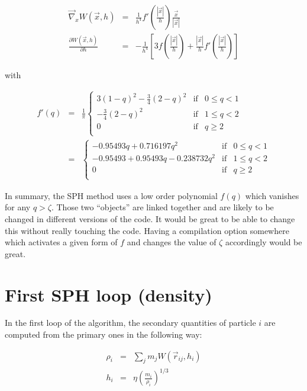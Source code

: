 \documentclass[a4paper,10pt]{article}
\begin{document}
\begin{eqnarray*}
 \vec\nabla_x W(\vec{x},h) &=& \frac{1}{h^4}f'\left(\frac{|\vec{x}|}{h}\right) \frac{\vec{x}}{|\vec{x}|} \\
 \frac{\partial W(\vec{x},h)}{\partial h} &=&- \frac{1}{h^4}\left[3f\left(\frac{|\vec{x}|}{h}\right) + 
\frac{|\vec{x}|}{h}f'\left(\frac{|\vec{x}|}{h}\right)\right]
\end{eqnarray*}

with

\begin{eqnarray*}
  f'(q)&=& \frac{1}{\pi}\left\lbrace \begin{array}{rcl}
                      3 \left(1-q\right)^2-\frac{3}{4} \left(2-q\right)^2 & \mbox{if} &
0 \leq q < 1 \\
 		      -\frac{3}{4} \left(2-q\right)^2 & \mbox{if} & 1 \leq q < 2 \\
		      0 & \mbox{if} & q \geq 2 \\
                     \end{array}
 \right. \\
&=&\left\lbrace \begin{array}{rcl}
    -0.95493 q + 0.716197 q^2& \mbox{if} & 0 \leq q < 1 \\
   -0.95493+0.95493 q-0.238732 q^2  & \mbox{if} & 1 \leq q < 2 \\
		      0 & \mbox{if} & q \geq 2 \\
                     \end{array}
 \right.
\end{eqnarray*}

In summary, the SPH method uses a low order polynomial $f(q)$ which vanishes for any $q>\zeta$. Those two ``objects''
are linked together and are likely to be changed in different versions of the code. It would be great to be able to
change this without really touching the code. 
Having a compilation option somewhere which activates a given form of $f$ and changes the value of $\zeta$ accordingly
would be great.

\section{First SPH loop (density)}

In the first loop of the algorithm, the secondary quantities of particle $i$ are computed from the primary ones in the
following way:

\begin{eqnarray}
 \rho_i &=& \sum_j m_j W(\vec{r}_{ij}, h_i)\\
 h_i &=& \eta \left(\frac{m_i}{\rho_i} \right)^{1/3}
\end{eqnarray}
\end{document}
